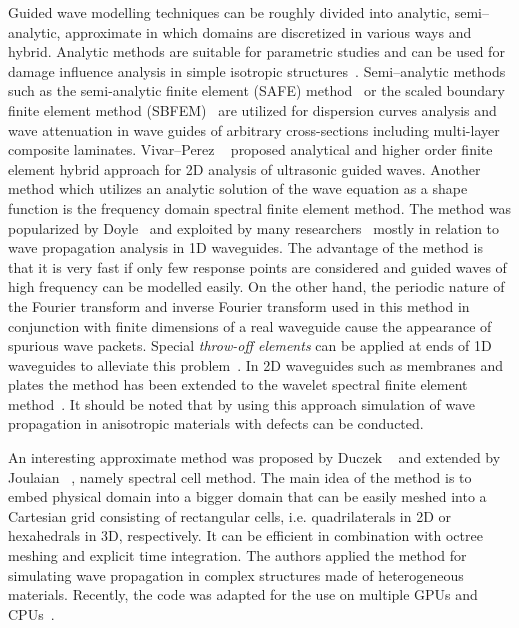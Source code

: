 \documentclass[12pt]{iopart}
\begin{document}
Guided wave modelling techniques can be roughly divided into analytic, semi--analytic, approximate in which domains are discretized in various ways and hybrid. Analytic methods are suitable for parametric studies and can be used for damage influence analysis in simple isotropic structures~\cite{Giurgiutiu2014}. Semi--analytic methods such as the semi-analytic finite element (SAFE) method~\cite{Bartoli2006} or the scaled boundary finite element method (SBFEM)~\cite{Gravenkamp2014} are utilized for dispersion curves analysis and wave attenuation in wave guides of arbitrary cross-sections including multi-layer composite laminates. Vivar--Perez \etal~\cite{Vivar-Perez2014} proposed analytical and higher order finite element hybrid approach for 2D analysis of ultrasonic guided waves. Another method which utilizes an analytic solution of the wave equation as a shape function is the frequency domain spectral finite element method. The method was popularized by Doyle~\cite{Doyle1989} and exploited by many researchers~\cite{RoyMahapatra2003,Palacz2005} mostly in relation to wave propagation analysis in 1D waveguides. The advantage of the method is that it is very fast if only few response points are considered and guided waves of high frequency can be modelled easily. On the other hand, the periodic nature of the Fourier transform and inverse Fourier transform used in this method in conjunction with finite dimensions of a real waveguide cause the appearance of spurious wave packets. Special \emph{throw-off elements} can be applied at ends of 1D waveguides to alleviate this problem~\cite{Doyle1989}. In 2D waveguides such as membranes and plates the method has been extended to the wavelet spectral finite element method~\cite{Mitra2008,Yang2016}. It should be noted that by using this approach simulation of wave propagation in anisotropic materials with defects can be conducted.

An interesting approximate method was proposed by Duczek \etal~\cite{Duczek2014} and extended by Joulaian \etal~\cite{Joulaian2014}, namely spectral cell method. The main idea of the method is to embed physical domain into a bigger domain that can be easily meshed into a Cartesian grid consisting of rectangular cells, i.e. quadrilaterals in 2D or hexahedrals in 3D, respectively. It can be efficient in combination with octree meshing and explicit time integration. The authors applied the method for simulating wave propagation in complex structures made of heterogeneous materials. Recently, the code was adapted for the use on multiple GPUs and CPUs~\cite{Mossaiby2019}. 
\end{document}
